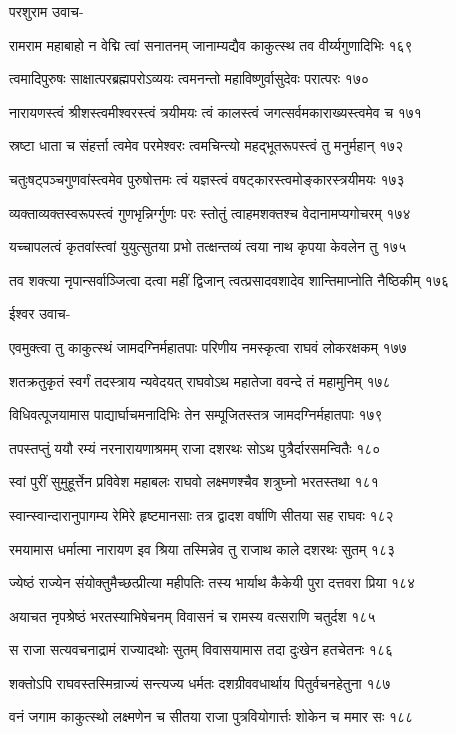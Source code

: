 परशुराम उवाच-

रामराम महाबाहो न वेद्मि त्वां सनातनम्
जानाम्यद्यैव काकुत्स्थ तव वीर्य्यगुणादिभिः १६९

त्वमादिपुरुषः साक्षात्परब्रह्मपरोऽव्ययः
त्वमनन्तो महाविष्णुर्वासुदेवः परात्परः १७०

नारायणस्त्वं श्रीशस्त्वमीश्वरस्त्वं त्रयीमयः
त्वं कालस्त्वं जगत्सर्वमकाराख्यस्त्वमेव च १७१

स्रष्टा धाता च संहर्त्ता त्वमेव परमेश्वरः
त्वमचिन्त्यो महद्भूतरूपस्त्वं तु मनुर्महान् १७२

चतुःषट्पञ्चगुणवांस्त्वमेव पुरुषोत्तमः
त्वं यज्ञस्त्वं वषट्कारस्त्वमोङ्कारस्त्रयीमयः १७३

व्यक्ताव्यक्तस्वरूपस्त्वं गुणभृन्निर्ग्गुणः परः
स्तोतुं त्वाहमशक्तश्च वेदानामप्यगोचरम् १७४

यच्चापलत्वं कृतवांस्त्वां युयुत्सुतया प्रभो
तत्क्षन्तव्यं त्वया नाथ कृपया केवलेन तु १७५

तव शक्त्या नृपान्सर्वाञ्जित्वा दत्वा महीं द्विजान्
त्वत्प्रसादवशादेव शान्तिमाप्नोति नैष्ठिकीम् १७६

ईश्वर उवाच-

एवमुक्त्वा तु काकुत्स्थं जामदग्निर्महातपाः
परिणीय नमस्कृत्वा राघवं लोकरक्षकम् १७७

शतक्रतुकृतं स्वर्गं तदस्त्राय न्यवेदयत्
राघवोऽथ महातेजा ववन्दे तं महामुनिम् १७८

विधिवत्पूजयामास पाद्यार्घाचमनादिभिः
तेन सम्पूजितस्तत्र जामदग्निर्महातपाः १७९

तपस्तप्तुं ययौ रम्यं नरनारायणाश्रमम्
राजा दशरथः सोऽथ पुत्रैर्दारसमन्वितैः १८०

स्वां पुरीं सुमुहूर्त्तेन प्रविवेश महाबलः
राघवो लक्ष्मणश्चैव शत्रुघ्नो भरतस्तथा १८१

स्वान्स्वान्दारानुपागम्य रेमिरे हृष्टमानसाः
तत्र द्वादश वर्षाणि सीतया सह राघवः १८२

रमयामास धर्मात्मा नारायण इव श्रिया
तस्मिन्नेव तु राजाथ काले दशरथः सुतम् १८३

ज्येष्ठं राज्येन संयोक्तुमैच्छत्प्रीत्या महीपतिः
तस्य भार्याथ कैकेयी पुरा दत्तवरा प्रिया १८४

अयाचत नृपश्रेष्ठं भरतस्याभिषेचनम्
विवासनं च रामस्य वत्सराणि चतुर्दश १८५

स राजा सत्यवचनाद्रामं राज्यादथोः सुतम्
विवासयामास तदा दुःखेन हतचेतनः १८६

शक्तोऽपि राघवस्तस्मिन्राज्यं सन्त्यज्य धर्मतः
दशग्रीववधार्थाय पितुर्वचनहेतुना १८७

वनं जगाम काकुत्स्थो लक्ष्मणेन च सीतया
राजा पुत्रवियोगार्त्तः शोकेन च ममार सः १८८

